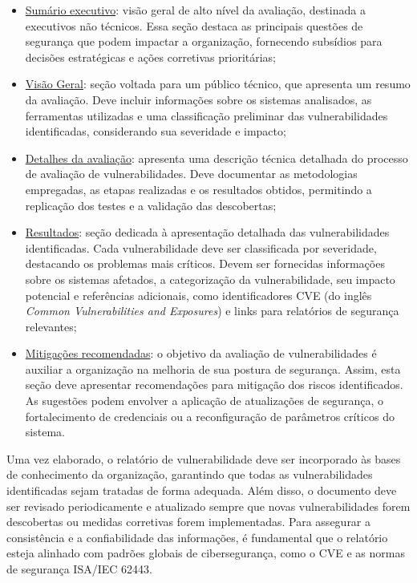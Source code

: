         \begin{itemize}
            \item \underline{Sumário executivo}: visão geral de alto nível da avaliação, destinada a executivos não técnicos. Essa seção destaca as principais questões de segurança que podem impactar a organização, fornecendo subsídios para decisões estratégicas e ações corretivas prioritárias;
            \item \underline{Visão Geral}: seção voltada para um público técnico, que apresenta um resumo da avaliação. Deve incluir informações sobre os sistemas analisados, as ferramentas utilizadas e uma classificação preliminar das vulnerabilidades identificadas, considerando sua severidade e impacto;
            \item \underline{Detalhes da avaliação}: apresenta uma descrição técnica detalhada do processo de avaliação de vulnerabilidades. Deve documentar as metodologias empregadas, as etapas realizadas e os resultados obtidos, permitindo a replicação dos testes e a validação das descobertas;
            \item \underline{Resultados}: seção dedicada à apresentação detalhada das vulnerabilidades identificadas. Cada vulnerabilidade deve ser classificada por severidade, destacando os problemas mais críticos. Devem ser fornecidas informações sobre os sistemas afetados, a categorização da vulnerabilidade, seu impacto potencial e referências adicionais, como identificadores CVE (do inglês \textit{Common Vulnerabilities and Exposures}) e links para relatórios de segurança relevantes;
            \item \underline{Mitigações recomendadas}: o objetivo da avaliação de vulnerabilidades é auxiliar a organização na melhoria de sua postura de segurança. Assim, esta seção deve apresentar recomendações para mitigação dos riscos identificados. As sugestões podem envolver a aplicação de atualizações de segurança, o fortalecimento de credenciais ou a reconfiguração de parâmetros críticos do sistema.
        \end{itemize}
    
        Uma vez elaborado, o relatório de vulnerabilidade deve ser incorporado às bases de conhecimento da organização, garantindo que todas as vulnerabilidades identificadas sejam tratadas de forma adequada. Além disso, o documento deve ser revisado periodicamente e atualizado sempre que novas vulnerabilidades forem descobertas ou medidas corretivas forem implementadas. Para assegurar a consistência e a confiabilidade das informações, é fundamental que o relatório esteja alinhado com padrões globais de cibersegurança, como o CVE e as normas de segurança ISA/IEC 62443.

